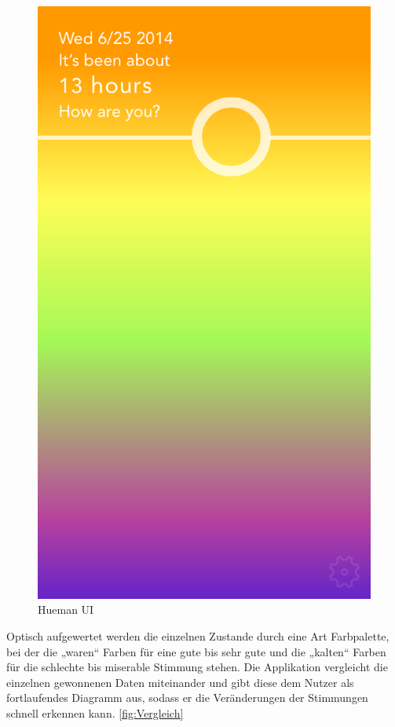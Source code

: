 \begin{figure}[h]
	\centering
	\includegraphics[scale=0.3]{images/hueman-app-main-ui.PNG}
	\caption{Hueman UI \cite{fig:HUI}}
	\label{fig:HUI}
\end{figure}

Optisch aufgewertet werden die einzelnen Zustande durch eine Art Farbpalette, bei der die „waren“ Farben für eine gute bis sehr gute und die „kalten“ Farben für die schlechte bis miserable Stimmung stehen.
Die Applikation vergleicht die einzelnen gewonnenen Daten miteinander und gibt diese dem Nutzer als fortlaufendes Diagramm aus, sodass er die Veränderungen der Stimmungen schnell erkennen kann.
\ref{fig:Vergleich}

